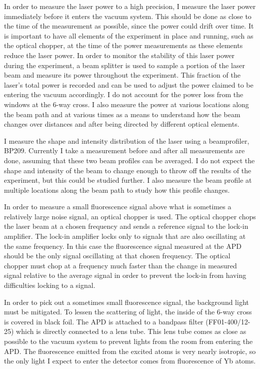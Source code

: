 \documentclass[12pt, a4paper]{article}
\begin{document}
In order to measure the laser power to a high precision, I measure the laser power immediately before it enters the vacuum system. This should be done as close to the time of the measurement as possible, since the power could drift over time. It is important to have all elements of the experiment in place and running, such as the optical chopper, at the time of the power measurements as these elements reduce the laser power. In order to monitor the stability of this laser power during the experiment, a beam splitter is used to sample a portion of the laser beam and measure its power throughout the experiment. This fraction of the laser's total power is recorded and can be used to adjust the power claimed to be entering the vacuum accordingly. I do not account for the power loss from the windows at the 6-way cross. I also measure the power at various locations along the beam path and at various times as a means to understand how the beam changes over distances and after being directed by different optical elements.

I measure the shape and intensity distribution of the laser using a beamprofiler, BP209. Currently I take a measurement before and after all measurements are done, assuming that these two beam profiles can be averaged. I do not expect the shape and intensity of the beam to change enough to throw off the results of the experiment, but this could be studied further. I also measure the beam profile at multiple locations along the beam path to study how this profile changes. 

In order to measure a small fluorescence signal above what is sometimes a relatively large noise signal, an optical chopper is used. The optical chopper chops the laser beam at a chosen frequency and sends a reference signal to the lock-in amplifier. The lock-in amplifier locks only to signals that are also oscillating at the same frequency. In this case the fluorescence signal measured at the APD should be the only signal oscillating at that chosen frequency. The optical chopper must chop at a frequency much faster than the change in measured signal relative to the average signal in order to prevent the lock-in from having difficulties locking to a signal.  

In order to pick out a sometimes small fluorescence signal, the background light must be mitigated. To lessen the scattering of light, the inside of the 6-way cross is covered in black foil. The APD is attached to a bandpass filter (FF01-400/12-25) which is directly connected to a lens tube. This lens tube comes as close as possible to the vacuum system to prevent lights from the room from entering the APD. The fluorescence emitted from the excited atoms is very nearly isotropic, so the only light I expect to enter the detector comes from fluorescence of Yb atoms.
\end{document}
